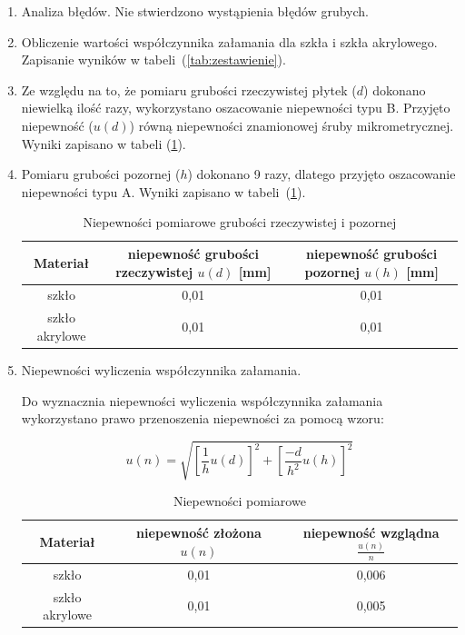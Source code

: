 \documentclass [a4paper,11pt]{article}
\begin{document}
\begin{enumerate}[label=\alph*)]
		\item Analiza błędów.
		Nie stwierdzono wystąpienia błędów grubych.
		
		\item Obliczenie wartości współczynnika załamania dla szkła i szkła akrylowego. Zapisanie wyników w tabeli~(\ref{tab:zestawienie}).
		
		\item Ze względu na to, że pomiaru grubości rzeczywistej płytek ($d$) dokonano niewielką ilość razy, wykorzystano oszacowanie niepewności typu B. Przyjęto niepewność ($u(d)$) równą niepewności znamionowej śruby mikrometrycznej. Wyniki zapisano w tabeli (\ref{tab:niephd}).
		
		\item Pomiaru grubości pozornej ($h$) dokonano 9 razy, dlatego przyjęto oszacowanie niepewności typu A. Wyniki zapisano w tabeli~(\ref{tab:niephd}).
		
		\begin{table}[!h]
			\caption{Niepewności pomiarowe grubości rzeczywistej i pozornej}
			\label{tab:niephd}
			\begin{center}
				\begin{tabular}{|c|c|c|}
					\hline Materiał & niepewność grubości rzeczywistej $u(d)$ [mm] & niepewność grubości pozornej $u(h)$ [mm] \\
					\hline szkło & 0,01 & 0,01 \\
					\hline szkło akrylowe & 0,01 & 0,01 \\
					\hline 
				\end{tabular} 
			\end{center}
		\end{table}
		
		\item Niepewności wyliczenia współczynnika załamania.
		
		Do wyznacznia niepewności wyliczenia współczynnika załamania wykorzystano prawo przenoszenia niepewności za pomocą wzoru:
		
		\begin{equation}
		\label{eq:niepewnosczlozona}
		u(n) = \sqrt{\left[ \frac{1}{h}u(d) \right]^2 + \left[ \frac{-d}{h^2}u(h) \right]^2}
		\end{equation}
		\begin{table}[!h]
			\caption{Niepewności pomiarowe}
			\label{tab:niepewnosci}
			\begin{center}
				\begin{tabular}{|c|c|c|}
					\hline Materiał & niepewność złożona $u(n)$ & niepewność wzglądna $\frac{u(n)}{n}$ \\
					\hline szkło & 0,01 & 0,006 \\
					\hline szkło akrylowe & 0,01 & 0,005 \\
					\hline 
				\end{tabular} 
			\end{center}
		\end{table}
		

\end{enumerate}
\end{document}
